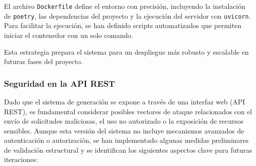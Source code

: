 El archivo \texttt{Dockerfile} define el entorno con precisión, incluyendo la instalación de \texttt{poetry}, las dependencias del proyecto y la ejecución del servidor con \texttt{uvicorn}. Para facilitar la ejecución, se han definido scripts automatizados que permiten iniciar el contenedor con un solo comando.

Esta estrategia prepara el sistema para un despliegue más robusto y escalable en futuras fases del proyecto.

\subsubsection{Seguridad en la API REST}

Dado que el sistema de generación se expone a través de una interfaz web (API REST), es fundamental considerar posibles vectores de ataque relacionados con el envío de solicitudes maliciosas, el uso no autorizado o la exposición de recursos sensibles. Aunque esta versión del sistema no incluye mecanismos avanzados de autenticación o autorización, se han implementado algunas medidas preliminares de validación estructural y se identifican los siguientes aspectos clave para futuras iteraciones:

